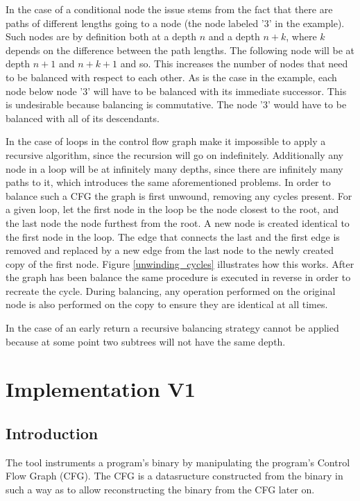 \documentclass{article}
\begin{document}
In the case of a conditional node the issue stems from the fact that there are paths of different lengths going to a node (the node labeled '3' in the example). Such nodes are by definition both at a depth $n$ and 
a depth $n+k$, where $k$ depends on the difference between the path lengths. The following node will be at depth $n+1$ and $n+k+1$ and so. This increases the number of nodes that need to be balanced with respect to each other.
As is the case in the example, each node below node '3' will have to be balanced with its immediate successor. This is undesirable because balancing is commutative. The node '3' would have to be balanced with all of its descendants.

In the case of loops in the control flow graph make it impossible to apply a recursive algorithm, since the recursion will go on indefinitely. Additionally any node in a loop will be at infinitely many depths, since there are infinitely many paths to it,
which introduces the same aforementioned problems. In order to balance such a CFG the graph is first unwound, removing any cycles present. 
For a given loop, let the first node in the loop be the node closest to the root, and the last node the node furthest from the root. A new node is created identical to the first node in the loop. 
The edge that connects the last and the first edge is removed and replaced by a new edge from the last node to the newly created copy of the first node. Figure \ref{unwinding_cycles} illustrates how this works. 
After the graph has been balance the same procedure is executed in reverse in order to recreate the cycle. During balancing, any operation performed on the original node is also performed on the copy to ensure they are identical at all times.

In the case of an early return a recursive balancing strategy cannot be applied because at some point two subtrees will not have the same depth. 


\section{Implementation V1}

\subsection{Introduction}
The tool instruments a program's binary by manipulating the program's Control Flow Graph (CFG). The CFG is a datasructure constructed from the binary in such a way 
as to allow reconstructing the binary from the CFG later on. 
\end{document}
